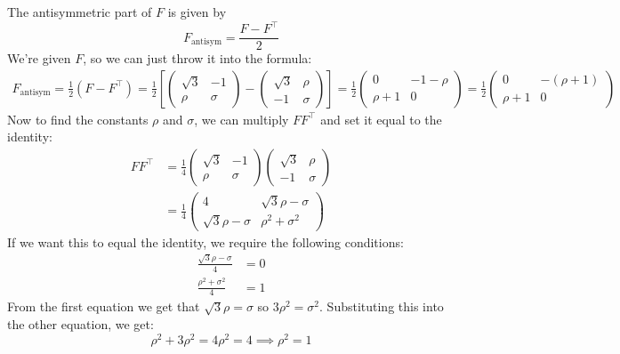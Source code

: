 \documentclass[10pt]{article}
\begin{document}
\begin{enumerate}[label=\alph*)]
			\begin{solution}
				The antisymmetric part of $F$ is given by 
				\[
					F_{\text{antisym}} = \frac{F - F^\top}{2}
				\] 
				We're given $F$, so we can just throw it into the formula:
				\begin{align*}
					F_{\text{antisym}} = \frac{1}{2}(F - F^\top) = \frac{1}{2}\left[\begin{pmatrix} \sqrt{3}  & -1 \\ \rho & \sigma \end{pmatrix} - \begin{pmatrix} \sqrt{3}  & \rho\\-1 & \sigma \end{pmatrix}\right] = \frac{1}{2}\begin{pmatrix}0 & -1 - \rho\\ \rho + 1 & 0   \end{pmatrix} = \frac{1}{2}\begin{pmatrix} 0 & -(\rho+1)\\ \rho+1 & 0 \end{pmatrix} 
				\end{align*}
				Now to find the constants $\rho$ and $\sigma$, we can multiply $F F^\top$ and set it equal to 
				the identity:
				\begin{align*}
					F F^\top &= \frac{1}{4}\begin{pmatrix} \sqrt{3}  & -1\\ \rho & \sigma \end{pmatrix} \begin{pmatrix} \sqrt{3} & \rho \\ -1 & \sigma \end{pmatrix}  \\
							 &= \frac{1}{4}\begin{pmatrix} 4 & \sqrt{3}\rho - \sigma\\ \sqrt{3} \rho - \sigma & \rho^2 + \sigma^2 \end{pmatrix}  
				\end{align*}
				If we want this to equal the identity, we require the following conditions:
				\begin{align*}
					\frac{\sqrt{3}\rho - \sigma}{4} &= 0 \\
					\frac{\rho^2 + \sigma^2}{4} &= 1
				\end{align*}
				From the first equation we get that $\sqrt{3} \rho = \sigma$ so $3 \rho^2 = \sigma^2$. 
				Substituting this into the other equation, we get:
				\[
				\rho^2 + 3\rho^2 = 4\rho^2 = 4 \implies \rho^2 = 1
\]
\end{solution}
\end{enumerate}
\end{document}
